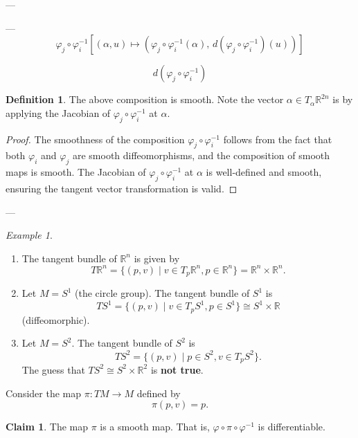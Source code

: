 \documentclass[11pt]{article}
\theoremstyle{definition}
\newtheorem{definition}{Definition}[section]
\newtheorem{claim}{Claim}
\theoremstyle{remark}
\newtheorem{example}{Example}[section]
\begin{document}
---

---
\[
\varphi_j \circ \varphi_i^{-1} \left[ (\alpha, u) \mapsto \left( \varphi_j \circ \varphi_i^{-1}(\alpha), \, d(\varphi_j \circ \varphi_i^{-1})(u) \right) \right]
\]

\[
d(\varphi_j \circ \varphi_i^{-1})
\]

\begin{definition}\label{def:transition_map}
The above composition is smooth. Note the vector $\alpha \in T_\alpha \mathbb{R}^{2n}$ is by applying the Jacobian of $\varphi_j \circ \varphi_i^{-1}$ at $\alpha$.
\end{definition}

\begin{proof}
The smoothness of the composition $\varphi_j \circ \varphi_i^{-1}$ follows from the fact that both $\varphi_i$ and $\varphi_j$ are smooth diffeomorphisms, and the composition of smooth maps is smooth. The Jacobian of $\varphi_j \circ \varphi_i^{-1}$ at $\alpha$ is well-defined and smooth, ensuring the tangent vector transformation is valid.
\end{proof}
---

\begin{example}\label{ex:tangent_bundle}
\begin{enumerate}
    \item The tangent bundle of $\mathbb{R}^n$ is given by
    \[
    T\mathbb{R}^n = \{(p,v) \mid v \in T_p \mathbb{R}^n, p \in \mathbb{R}^n\}
    = \mathbb{R}^n \times \mathbb{R}^n.
    \]

    \item Let $M = S^1$ (the circle group). The tangent bundle of $S^1$ is
    \[
    TS^1 = \{(p,v) \mid v \in T_p S^1, p \in S^1\}
    \cong S^1 \times \mathbb{R}
    \]
    (diffeomorphic).

    \item Let $M = S^2$. The tangent bundle of $S^2$ is
    \[
    TS^2 = \{(p,v) \mid p \in S^2, v \in T_p S^2\}.
    \]
    The guess that $TS^2 \cong S^2 \times \mathbb{R}^2$ is \textbf{not true}.
\end{enumerate}
\end{example}

Consider the map $\pi : TM \to M$ defined by
\[
\pi(p,v) = p.
\]

\begin{claim}\label{clm:pi_smooth}
The map $\pi$ is a smooth map. That is, $\varphi \circ \pi \circ \varphi^{-1}$ is differentiable.
\end{claim}
\end{document}
